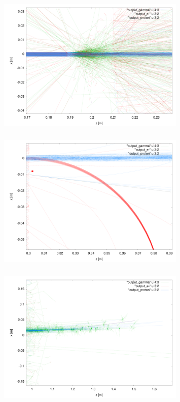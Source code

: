 \documentclass{beamer}
\newcommand{\ident}{\thesection.\thesubsection}
\newcommand{\ftitle}{\frametitle{\nameref{\ident}}}
\begin{document}
\begin{frame}
	\ftitle
	\begin{figure}
		\includegraphics[width=0.8\textwidth]{img/beamline_traj_pinhole}
	\end{figure}
\end{frame}

\begin{frame}
	\ftitle
	\begin{figure}
		\includegraphics[width=0.8\textwidth]{img/beamline_traj_spectrometer}
	\end{figure}
\end{frame}

\begin{frame}
	\ftitle
	\begin{figure}
		\includegraphics[width=0.8\textwidth]{img/beamline_traj_beamdump}
	\end{figure}
\end{frame}
\end{document}

